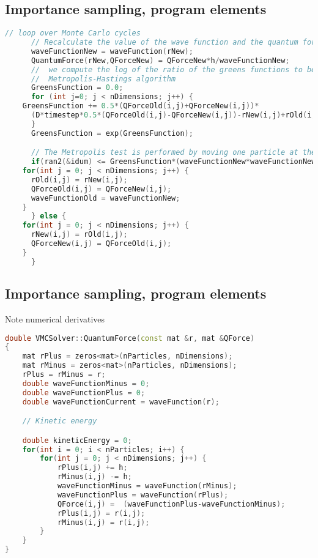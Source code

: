 \documentclass[graybox,sectrefs,envcountresetchap,open=right]{svmonodo}
\begin{document}
\subsection{Importance sampling, program elements}

\begin{lstlisting}[language=C++,style=blue1]
  // loop over Monte Carlo cycles
      // Recalculate the value of the wave function and the quantum force
      waveFunctionNew = waveFunction(rNew);
      QuantumForce(rNew,QForceNew) = QForceNew*h/waveFunctionNew;
      //  we compute the log of the ratio of the greens functions to be used in the 
      //  Metropolis-Hastings algorithm
      GreensFunction = 0.0;            
      for (int j=0; j < nDimensions; j++) {
	GreensFunction += 0.5*(QForceOld(i,j)+QForceNew(i,j))*
	  (D*timestep*0.5*(QForceOld(i,j)-QForceNew(i,j))-rNew(i,j)+rOld(i,j));
      }
      GreensFunction = exp(GreensFunction);

      // The Metropolis test is performed by moving one particle at the time
      if(ran2(&idum) <= GreensFunction*(waveFunctionNew*waveFunctionNew) / (waveFunctionOld*waveFunctionOld)) {
	for(int j = 0; j < nDimensions; j++) {
	  rOld(i,j) = rNew(i,j);
	  QForceOld(i,j) = QForceNew(i,j);
	  waveFunctionOld = waveFunctionNew;
	}
      } else {
	for(int j = 0; j < nDimensions; j++) {
	  rNew(i,j) = rOld(i,j);
	  QForceNew(i,j) = QForceOld(i,j);
	}
      }
\end{lstlisting}


\subsection{Importance sampling, program elements}
 Note numerical derivatives
\begin{lstlisting}[language=C++,style=blue1]
double VMCSolver::QuantumForce(const mat &r, mat &QForce)
{
    mat rPlus = zeros<mat>(nParticles, nDimensions);
    mat rMinus = zeros<mat>(nParticles, nDimensions);
    rPlus = rMinus = r;
    double waveFunctionMinus = 0;
    double waveFunctionPlus = 0;
    double waveFunctionCurrent = waveFunction(r);

    // Kinetic energy

    double kineticEnergy = 0;
    for(int i = 0; i < nParticles; i++) {
        for(int j = 0; j < nDimensions; j++) {
            rPlus(i,j) += h;
            rMinus(i,j) -= h;
            waveFunctionMinus = waveFunction(rMinus);
            waveFunctionPlus = waveFunction(rPlus);
            QForce(i,j) =  (waveFunctionPlus-waveFunctionMinus);
            rPlus(i,j) = r(i,j);
            rMinus(i,j) = r(i,j);
        }
    }
}
\end{lstlisting}
\end{document}

